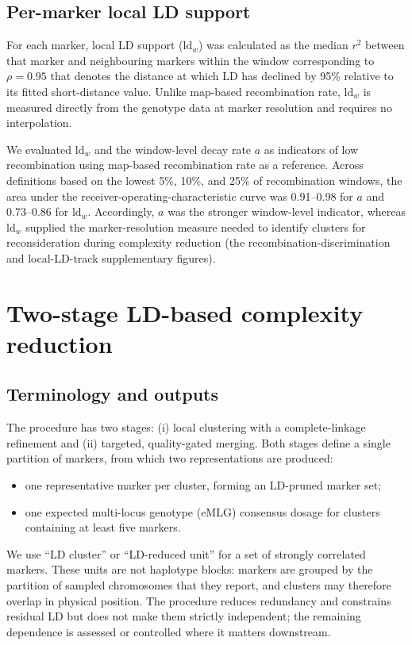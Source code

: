 \documentclass[11pt]{article}
\begin{document}
\subsection{Per-marker local LD support}

For each marker, local LD support (\(\mathrm{ld}_w\)) was calculated as the
median \(r^2\) between that marker and neighbouring markers within the window
corresponding to \(\rho=0.95\) that denotes the distance at which LD has declined by 95\% relative to its fitted short-distance value. Unlike map-based recombination rate, \(\mathrm{ld}_w\) is measured directly from the genotype data at marker resolution and requires no interpolation.

We evaluated \(\mathrm{ld}_w\) and the window-level decay rate \(a\) as
indicators of low recombination using map-based recombination rate as a
reference. Across definitions based on the lowest 5\%, 10\%, and 25\% of
recombination windows, the area under the receiver-operating-characteristic
curve was 0.91--0.98 for \(a\) and 0.73--0.86 for \(\mathrm{ld}_w\).
Accordingly, \(a\) was the stronger window-level indicator, whereas
\(\mathrm{ld}_w\) supplied the marker-resolution measure needed to identify
clusters for reconsideration during complexity reduction
(the recombination-discrimination and local-LD-track supplementary figures).

\section{Two-stage LD-based complexity reduction}

\subsection{Terminology and outputs}

The procedure has two stages: (i) local clustering with a complete-linkage
refinement and (ii) targeted, quality-gated merging. Both stages define a single
partition of markers, from which two representations are produced:
\begin{itemize}
  \item one representative marker per cluster, forming an LD-pruned marker set;
  \item one expected multi-locus genotype (eMLG) consensus dosage for clusters
        containing at least five markers.
\end{itemize}

We use ``LD cluster'' or ``LD-reduced unit'' for a set of strongly correlated
markers. These units are not haplotype blocks: markers are grouped by the
partition of sampled chromosomes that they report, and clusters may therefore
overlap in physical position. The procedure reduces redundancy and constrains residual LD but does not make them strictly independent; the remaining
dependence is assessed or controlled where it matters downstream.
\end{document}
